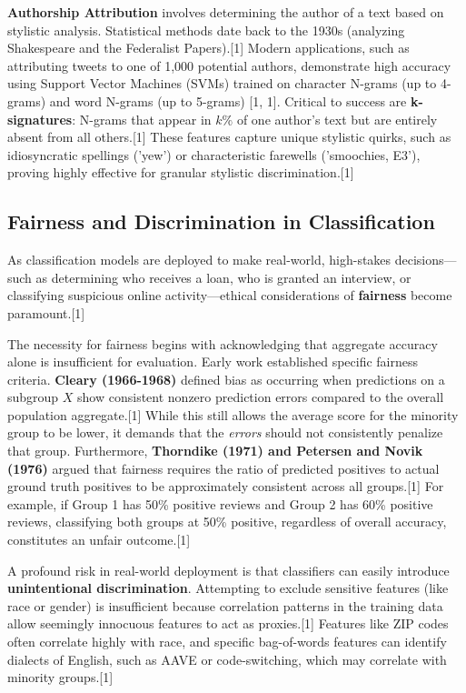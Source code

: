 \documentclass{article}
\begin{document}
\textbf{Authorship Attribution} involves determining the author of a text based on stylistic analysis. Statistical methods date back to the 1930s (analyzing Shakespeare and the Federalist Papers).[1] Modern applications, such as attributing tweets to one of 1,000 potential authors, demonstrate high accuracy using Support Vector Machines (SVMs) trained on character N-grams (up to 4-grams) and word N-grams (up to 5-grams) [1, 1]. Critical to success are \textbf{k-signatures}: N-grams that appear in $k\%$ of one author's text but are entirely absent from all others.[1] These features capture unique stylistic quirks, such as idiosyncratic spellings ('yew') or characteristic farewells ('smoochies, E3'), proving highly effective for granular stylistic discrimination.[1]

\subsection{Fairness and Discrimination in Classification}

As classification models are deployed to make real-world, high-stakes decisions—such as determining who receives a loan, who is granted an interview, or classifying suspicious online activity—ethical considerations of \textbf{fairness} become paramount.[1]

The necessity for fairness begins with acknowledging that aggregate accuracy alone is insufficient for evaluation. Early work established specific fairness criteria. \textbf{Cleary (1966-1968)} defined bias as occurring when predictions on a subgroup $X$ show consistent nonzero prediction errors compared to the overall population aggregate.[1] While this still allows the average score for the minority group to be lower, it demands that the \textit{errors} should not consistently penalize that group. Furthermore, \textbf{Thorndike (1971) and Petersen and Novik (1976)} argued that fairness requires the ratio of predicted positives to actual ground truth positives to be approximately consistent across all groups.[1] For example, if Group 1 has 50\% positive reviews and Group 2 has 60\% positive reviews, classifying both groups at 50\% positive, regardless of overall accuracy, constitutes an unfair outcome.[1]

A profound risk in real-world deployment is that classifiers can easily introduce \textbf{unintentional discrimination}. Attempting to exclude sensitive features (like race or gender) is insufficient because correlation patterns in the training data allow seemingly innocuous features to act as proxies.[1] Features like ZIP codes often correlate highly with race, and specific bag-of-words features can identify dialects of English, such as AAVE or code-switching, which may correlate with minority groups.[1]
\end{document}
